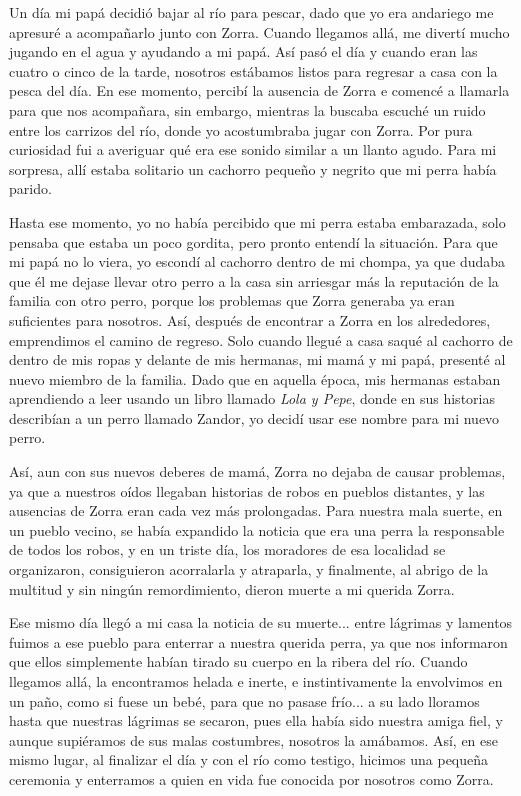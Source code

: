Un día mi papá decidió bajar al río para pescar, dado que yo era andariego me apresuré a acompañarlo junto con Zorra. 
Cuando llegamos allá, me divertí mucho jugando en el agua y ayudando a mi papá. Así pasó el día y cuando eran las cuatro o cinco de la tarde, nosotros estábamos listos para regresar a casa con la pesca del día.
En ese momento, percibí la ausencia de Zorra e comencé a llamarla para que nos acompañara, 
sin embargo, mientras la buscaba escuché un ruido entre los carrizos del río, donde yo acostumbraba jugar con Zorra. 
Por pura curiosidad fui a averiguar qué era ese sonido similar a un llanto agudo. Para mi sorpresa, allí estaba solitario un cachorro pequeño y negrito que mi perra había parido.

Hasta ese momento, yo no había percibido que mi perra estaba embarazada, solo pensaba que estaba un poco gordita,
pero pronto entendí la situación.
Para que mi papá no lo viera, yo escondí al cachorro dentro de mi chompa, ya que dudaba que él me dejase llevar otro perro a la casa sin arriesgar más la reputación de la familia con otro perro, porque los problemas que Zorra generaba ya eran suficientes para nosotros.
Así, después de encontrar a Zorra en los alrededores, emprendimos el camino de regreso.
Solo cuando llegué a casa saqué al cachorro de dentro de mis ropas y delante de mis hermanas, mi mamá y mi papá, presenté al nuevo miembro de la familia. Dado que en aquella época, mis hermanas estaban aprendiendo a leer usando un libro llamado \textit{Lola y Pepe}, donde en sus historias describían a un perro llamado Zandor, yo decidí usar ese nombre para mi nuevo perro.

Así, aun con sus nuevos deberes de mamá, Zorra no dejaba de causar problemas, ya que a nuestros oídos llegaban historias de robos en pueblos distantes, y las ausencias de Zorra eran cada vez más prolongadas.
Para nuestra mala suerte, en un pueblo vecino, se había expandido la noticia que era una perra la responsable de todos los robos, y en un triste día, los moradores de esa localidad se organizaron, consiguieron acorralarla y atraparla, y finalmente, al abrigo de la multitud y sin ningún remordimiento, dieron muerte a mi querida Zorra. 

Ese mismo día llegó a mi casa la noticia de su muerte... entre lágrimas y lamentos fuimos a ese pueblo para enterrar a nuestra querida perra, ya que nos informaron que ellos simplemente habían tirado su cuerpo en la ribera del río. Cuando llegamos allá, la encontramos helada e inerte, e instintivamente la envolvimos en un paño, como si fuese un bebé, para que no pasase frío... a su lado lloramos hasta que nuestras lágrimas se secaron, pues ella había sido nuestra amiga fiel, y aunque supiéramos de sus malas costumbres, nosotros la amábamos.
Así, en ese mismo lugar, al finalizar el día y con el río como testigo, hicimos una pequeña ceremonia y enterramos a quien en vida fue conocida por nosotros como Zorra.

